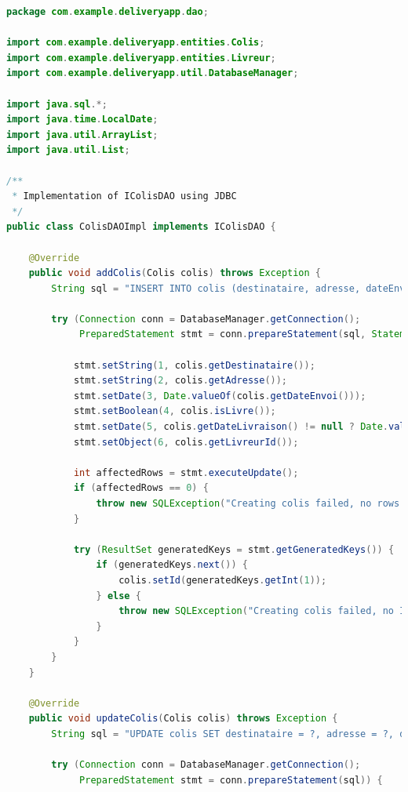 \documentclass{rapportENSIAS}
\begin{document}
\begin{lstlisting}[language=Java, caption=Impl\'{e}mentation ColisDAOImpl compl\`{e}te]
package com.example.deliveryapp.dao;

import com.example.deliveryapp.entities.Colis;
import com.example.deliveryapp.entities.Livreur;
import com.example.deliveryapp.util.DatabaseManager;

import java.sql.*;
import java.time.LocalDate;
import java.util.ArrayList;
import java.util.List;

/**
 * Implementation of IColisDAO using JDBC
 */
public class ColisDAOImpl implements IColisDAO {
    
    @Override
    public void addColis(Colis colis) throws Exception {
        String sql = "INSERT INTO colis (destinataire, adresse, dateEnvoi, livre, dateLivraison, livreur_id) VALUES (?, ?, ?, ?, ?, ?)";
        
        try (Connection conn = DatabaseManager.getConnection();
             PreparedStatement stmt = conn.prepareStatement(sql, Statement.RETURN_GENERATED_KEYS)) {
            
            stmt.setString(1, colis.getDestinataire());
            stmt.setString(2, colis.getAdresse());
            stmt.setDate(3, Date.valueOf(colis.getDateEnvoi()));
            stmt.setBoolean(4, colis.isLivre());
            stmt.setDate(5, colis.getDateLivraison() != null ? Date.valueOf(colis.getDateLivraison()) : null);
            stmt.setObject(6, colis.getLivreurId());
            
            int affectedRows = stmt.executeUpdate();
            if (affectedRows == 0) {
                throw new SQLException("Creating colis failed, no rows affected.");
            }
            
            try (ResultSet generatedKeys = stmt.getGeneratedKeys()) {
                if (generatedKeys.next()) {
                    colis.setId(generatedKeys.getInt(1));
                } else {
                    throw new SQLException("Creating colis failed, no ID obtained.");
                }
            }
        }
    }
    
    @Override
    public void updateColis(Colis colis) throws Exception {
        String sql = "UPDATE colis SET destinataire = ?, adresse = ?, dateEnvoi = ?, livre = ?, dateLivraison = ?, livreur_id = ? WHERE id = ?";
        
        try (Connection conn = DatabaseManager.getConnection();
             PreparedStatement stmt = conn.prepareStatement(sql)) {
            

\end{lstlisting}
\end{document}
